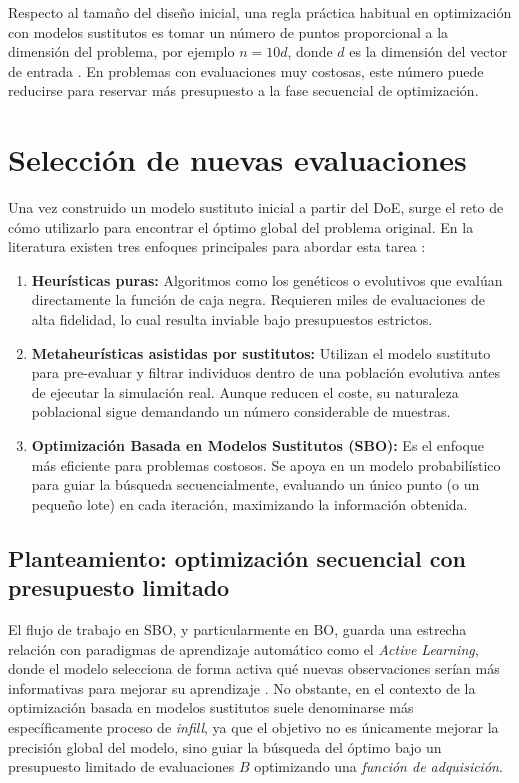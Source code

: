 Respecto al tamaño del diseño inicial, una regla práctica habitual en optimización con
modelos sustitutos es tomar un número de puntos proporcional a la dimensión del problema,
por ejemplo \(n=10d\), donde \(d\) es la dimensión del vector de entrada \cite{jones1998efficient}.
En problemas con evaluaciones muy costosas, este número puede reducirse para reservar
más presupuesto a la fase secuencial de optimización.

\section{Selección de nuevas evaluaciones}

Una vez construido un modelo sustituto inicial a partir del DoE, surge el reto de cómo utilizarlo para encontrar el óptimo global del problema original. En la literatura existen tres enfoques principales para abordar esta tarea \cite{jiang2020surrogate}:

\begin{enumerate}
    \item \textbf{Heurísticas puras:} Algoritmos como los genéticos o evolutivos que evalúan directamente la función de caja negra. Requieren miles de evaluaciones de alta fidelidad, lo cual resulta inviable bajo presupuestos estrictos.
    \item \textbf{Metaheurísticas asistidas por sustitutos:} Utilizan el modelo sustituto para pre-evaluar y filtrar individuos dentro de una población evolutiva antes de ejecutar la simulación real. Aunque reducen el coste, su naturaleza poblacional sigue demandando un número considerable de muestras.
    \item \textbf{Optimización Basada en Modelos Sustitutos (SBO):} Es el enfoque más eficiente para problemas costosos. Se apoya en un modelo probabilístico para guiar la búsqueda secuencialmente, evaluando un único punto (o un pequeño lote) en cada iteración, maximizando la información obtenida.
\end{enumerate}

\subsection{Planteamiento: optimización secuencial con presupuesto limitado}
El flujo de trabajo en SBO, y particularmente en BO, guarda una estrecha relación con paradigmas de aprendizaje automático como el \textit{Active Learning}, donde el modelo selecciona de forma activa qué nuevas observaciones serían más informativas para mejorar su aprendizaje \cite{settles2009active}. No obstante, en el contexto de la optimización basada en modelos sustitutos suele denominarse más específicamente proceso de \emph{infill}, ya que el
objetivo no es únicamente mejorar la precisión global del modelo, sino guiar la búsqueda
del óptimo bajo un presupuesto limitado de evaluaciones $B$ optimizando una \textit{función de adquisición}. 

